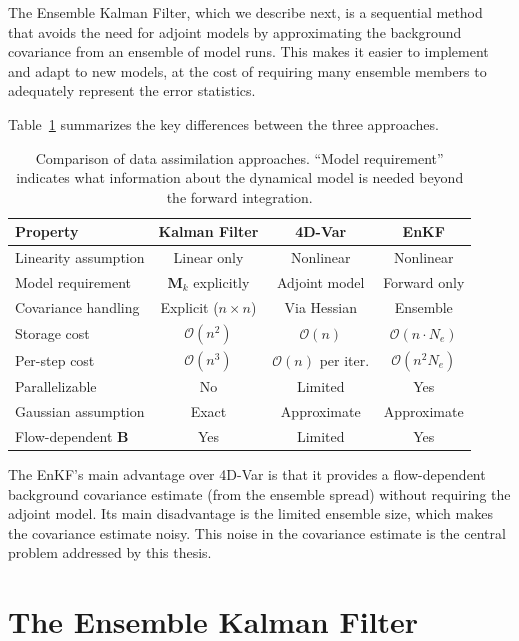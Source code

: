 The Ensemble Kalman Filter, which we describe next, is a sequential method that avoids the need for adjoint models by approximating the background covariance from an ensemble of model runs. This makes it easier to implement and adapt to new models, at the cost of requiring many ensemble members to adequately represent the error statistics.

Table~\ref{tab:da_comparison} summarizes the key differences between the three approaches.

\begin{table}[htbp]
\centering
\caption{Comparison of data assimilation approaches. ``Model requirement'' indicates what information about the dynamical model is needed beyond the forward integration.}
\label{tab:da_comparison}
\begin{tabular}{@{}lccc@{}}
\toprule
Property & Kalman Filter & 4D-Var & EnKF \\
\midrule
Linearity assumption & Linear only & Nonlinear & Nonlinear \\
Model requirement & $\mathbf{M}_k$ explicitly & Adjoint model & Forward only \\
Covariance handling & Explicit ($n \times n$) & Via Hessian & Ensemble \\
Storage cost & $\mathcal{O}(n^2)$ & $\mathcal{O}(n)$ & $\mathcal{O}(n \cdot N_e)$ \\
Per-step cost & $\mathcal{O}(n^3)$ & $\mathcal{O}(n)$ per iter. & $\mathcal{O}(n^2 N_e)$ \\
Parallelizable & No & Limited & Yes \\
Gaussian assumption & Exact & Approximate & Approximate \\
Flow-dependent $\mathbf{B}$ & Yes & Limited & Yes \\
\bottomrule
\end{tabular}
\end{table}

The EnKF's main advantage over 4D-Var is that it provides a flow-dependent background covariance estimate (from the ensemble spread) without requiring the adjoint model. Its main disadvantage is the limited ensemble size, which makes the covariance estimate noisy. This noise in the covariance estimate is the central problem addressed by this thesis.

\section{The Ensemble Kalman Filter}
\label{sec:enkf}

